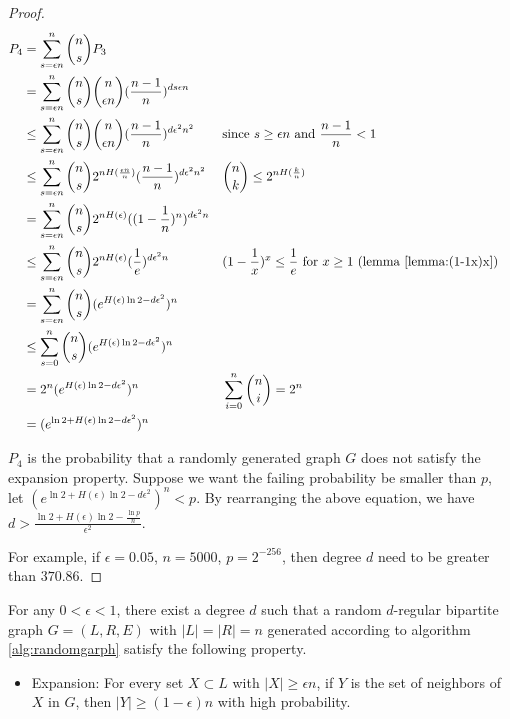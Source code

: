 \begin{proof}
\begin{align}
P_4 &= \sum_{s=\epsilon n}^{n} \binom{n}{s} P_3 \nonumber \\
    &= \sum_{s=\epsilon n}^{n} \binom{n}{s} \binom{n}{\epsilon n} (\frac{n-1}{n})^{d s \epsilon n} \nonumber \\
    &\le \sum_{s=\epsilon n}^{n} \binom{n}{s} \binom{n}{\epsilon n} (\frac{n-1}{n})^{d \epsilon^2 n^2} 
    && \text{since } s \ge \epsilon n \text{ and } \frac{n-1}{n} < 1 \nonumber \\
    &\le \sum_{s=\epsilon n}^{n} \binom{n}{s} 2^{n H(\frac{\epsilon n}{n})} (\frac{n-1}{n})^{d \epsilon^2 n^2} 
    && \binom{n}{k} \le 2^{n H(\frac{k}{n})} \nonumber \\
    &= \sum_{s=\epsilon n}^{n} \binom{n}{s} 2^{n H(\epsilon)} ((1 - \frac{1}{n})^{n})^{d \epsilon^2 n} \nonumber \\
    &\le \sum_{s=\epsilon n}^{n} \binom{n}{s} 2^{n H(\epsilon)} (\frac{1}{e})^{d \epsilon^2 n} 
    && (1 - \frac{1}{x})^x \le \frac{1}{e} \text{ for } x \ge 1 \text{ (lemma \ref{lemma:(1-1x)x})} \nonumber \\
    &= \sum_{s=\epsilon n}^{n} \binom{n}{s} (e^{ H(\epsilon) \ln 2  - d \epsilon^2})^n \nonumber \\
    &\le \sum_{s=0}^{n} \binom{n}{s} (e^{ H(\epsilon) \ln 2 - d \epsilon^2})^n \nonumber \\
    &= 2^n (e^{ H(\epsilon) \ln 2 - d \epsilon^2})^n 
    && \sum_{i=0}^n \binom{n}{i} = 2^n \nonumber \\
    &= (e^{\ln 2 + H(\epsilon) \ln 2 - d \epsilon^2})^n \nonumber \\
\end{align}

$P_4$ is the probability that a randomly generated graph $G$ does not satisfy the expansion property. Suppose we want the failing probability be smaller than $p$, let $(e^{\ln 2 + H(\epsilon) \ln 2 - d \epsilon^2})^n < p$.
By rearranging the above equation, we have $ d > \frac{\ln 2 + H(\epsilon) \ln 2 - \frac{\ln p}{n}}{\epsilon^2}$.

For example, if $\epsilon = 0.05$, $n = 5000$, $p = 2^{-256}$, then degree $d$ need to be greater than $370.86$.

\end{proof}


\begin{lemma}
\label{lemma:randomgraph2}

For any $0 < \epsilon < 1$, there exist a degree $d$ such that a random $d$-regular bipartite graph $G=(L, R, E)$ with $|L| = |R| = n$ generated according to algorithm \ref{alg:randomgarph} satisfy the following property.

    \begin{itemize}
        \item Expansion: For every set $X \subset L$ with $|X| \ge \epsilon n$, if $Y$ is the set of neighbors of $X$ in $G$, then $|Y| \ge (1 - \epsilon)  n$ with high probability.
    \end{itemize}

\end{lemma}


